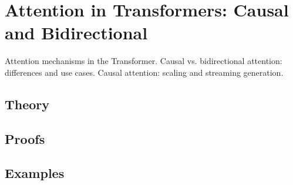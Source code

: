 
\section{Attention in Transformers: Causal and Bidirectional}
\label{sec:2.5.04-transformer-attention}

\begin{ticket}
Attention mechanisms in the Transformer. Causal vs. bidirectional attention: differences and use cases. Causal attention: scaling and streaming generation.
\end{ticket}

\subsection*{Theory}

\subsection*{Proofs}

\subsection*{Examples}
